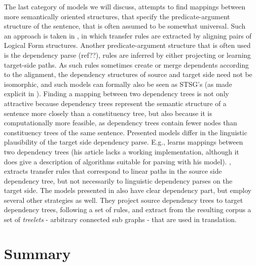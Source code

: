 \documentclass[a4paper, 11pt]{report}
\theoremstyle{definition}
\theoremstyle{plain}
\begin{document}
The last category of models we will discuss, attempts to find mappings between more semantically oriented structures, that specify the predicate-argument structure of the sentence, that is often assumed to be somewhat universal. Such an approach is taken in \cite{menezes2003best}, in which transfer rules are extracted by aligning pairs of Logical Form structures. Another predicate-argument structure that is often used is the dependency parse (ref??), rules are inferred by either projecting or learning target-side paths. As such rules sometimes create or merge dependents according to the alignment, the dependency structures of source and target side need not be isomorphic, and such models can formally also be seen as STSG's (as made explicit in \cite{eisner2003learning}). Finding a mapping between two dependency trees is not only attractive because dependency trees represent the semantic structure of a sentence more closely than a constituency tree, but also because it is computationally more feasible, as dependency trees contain fewer nodes than constituency trees of the same sentence. Presented models differ in the linguistic plausibility of the target side dependency parse. E.g., \cite{eisner2003learning} learns mappings between two dependency trees (his article lacks a working implementation, although it does give a description of algorithms suitable for parsing with his model). \cite{lin2004path}, extracts transfer rules that correspond to linear paths in the source side dependency tree, but not necessarily to linguistic dependency parses on the target side. The models presented in \cite{quirk2005dependency,quirk2006dependency,quirk2006we} also have clear dependency part, but employ several other strategies as well. They project source dependency trees to target dependency trees, following a set of rules, and extract from the resulting corpus a set of \textit{treelets} - arbitrary connected sub graphs - that are used in translation.

\section{Summary}
\end{document}

